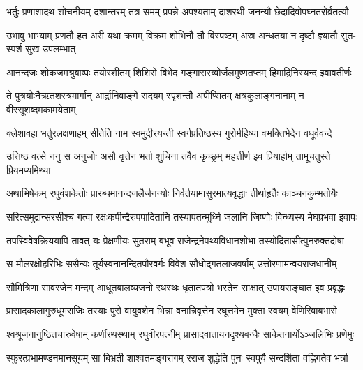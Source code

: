 
\fourlineindentedshloka
{भर्तुः प्रणाशादथ शोचनीयम्}
{दशान्तरम् तत्र समम् प्रपन्ने}
{अपश्यताम् दाशरथी जनन्यौ}
{छेदादिवोपघ्नतरोर्व्रतत्यौ} %

\fourlineindentedshloka
{उभावु भाभ्याम् प्रणतौ हत अरी}
{यथा क्रमम् विक्रम शोभिनौ तौ}
{विस्पष्टम् अस्र अन्धतया न दृष्टौ}
{ज्ञ्यातौ सुत-स्पर्श सुख उपलम्भात्} %

\fourlineindentedshloka
{आनन्दजः शोकजमश्रुबाष्पः}
{तयोरशीतम् शिशिरो बिभेद}
{गङ्गासरय्वोर्जलमुष्णतप्तम्}
{हिमाद्रिनिस्यन्द इवावतीर्णः} %

\fourlineindentedshloka
{ते पुत्रयोःनैऋतशस्त्रमार्गान्}
{आर्द्रानिवाङ्गे सदयम् स्पृशन्तौ}
{अपीप्सितम् क्षत्रकुलाङ्गनानाम्}
{न वीरसूशब्दमकामयेताम्} %

\fourlineindentedshloka
{क्लेशावहा भर्तुरलक्षणाहम्}
{सीतेति नाम स्वमुदीरयन्ती}
{स्वर्गप्रतिष्ठस्य गुरोर्महिष्या}
{वभक्तिभेदेन वधूर्ववन्दे} %

\fourlineindentedshloka
{उत्तिष्ठ वत्से ननु स अनुजोः असौ}
{वृत्तेन भर्ता शुचिना तवैव}
{कृच्छ्रम् महत्तीर्ण इव प्रियार्हाम्}
{तामूचतुस्ते प्रियमप्यमिथ्या} %

\fourlineindentedshloka
{अथाभिषेकम् रघुवंशकेतोः}
{प्रारब्धमानन्दजलैर्जनन्योः}
{निर्वर्तयामासुरमात्यवृद्धाः}
{तीर्थाहृतैः काञ्चनकुम्भतोयैः} %

\fourlineindentedshloka
{सरित्समुद्रान्सरसीश्च गत्वा}
{रक्षःकपीन्द्रैरुपपादितानि}
{तस्यापतन्मूर्ध्नि जलानि जिष्णोः}
{विन्ध्यस्य मेघप्रभवा इवापः} %

\fourlineindentedshloka
{तपस्विवेषक्रिययापि तावत्}
{यः प्रेक्षणीयः सुतराम् बभूव}
{राजेन्द्रनेपथ्यविधानशोभा}
{तस्योदितासीत्पुनरुक्तदोषा} %

\fourlineindentedshloka
{स मौलरक्षोहरिभिः ससैन्यः}
{तूर्यस्वनानन्दितपौरवर्गः}
{विवेश सौधोद्गतलाजवर्षाम्}
{उत्तोरणामन्वयराजधानीम्} %

\fourlineindentedshloka
{सौमित्रिणा सावरजेन मन्दम्}
{आधूतबालव्यजनो रथस्थः}
{धृतातपत्रो भरतेन साक्षात्}
{उपायसङ्घात इव प्रवृद्धः} %

\fourlineindentedshloka
{प्रासादकालागुरुधूमराजिः}
{तस्याः पुरो वायुवशेन भिन्ना}
{वनान्निवृत्तेन रघूत्तमेन}
{मुक्ता स्वयम् वेणिरिवाबभासे} %

\fourlineindentedshloka
{श्वश्रूजनानुष्ठितचारुवेषाम्}
{कर्णीरथस्थाम् रघुवीरपत्नीम्}
{प्रासादवातायनदृश्यबन्धैः}
{साकेतनार्योऽञ्जलिभिः प्रणेमुः} %

\fourlineindentedshloka
{स्फुरत्प्रभामण्डनमानसूयम्}
{सा बिभ्रती शाश्वतमङ्गरागम्}
{रराज शुद्धेति पुनः स्वपुर्यै}
{सन्दर्शिता वह्निगतेव भर्त्रा} %

